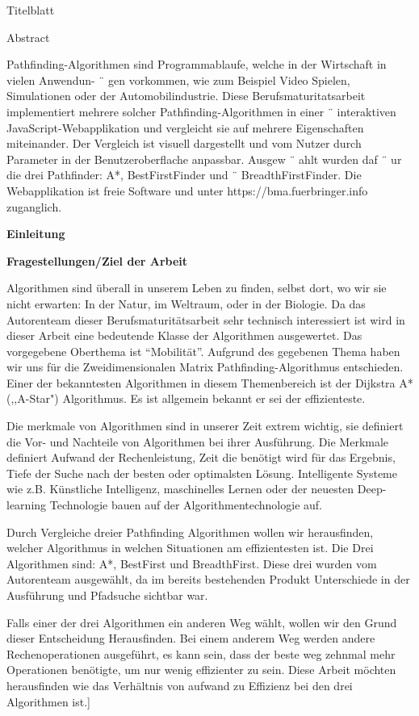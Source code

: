 Titelblatt

Abstract

Pathfinding-Algorithmen sind Programmablaufe, welche in der Wirtschaft
in vielen Anwendun- ¨ gen vorkommen, wie zum Beispiel Video Spielen,
Simulationen oder der Automobilindustrie. Diese Berufsmaturitatsarbeit
implementiert mehrere solcher Pathfinding-Algorithmen in einer ¨
interaktiven JavaScript-Webapplikation und vergleicht sie auf mehrere
Eigenschaften miteinander. Der Vergleich ist visuell dargestellt und vom
Nutzer durch Parameter in der Benutzeroberflache anpassbar. Ausgew ¨
ahlt wurden daf ¨ ur die drei Pathfinder: A*, BestFirstFinder und ¨
BreadthFirstFinder. Die Webapplikation ist freie Software und unter
https://bma.fuerbringer.info zuganglich.

\textbf{Einleitung}

\textbf{Fragestellungen/Ziel der Arbeit}

Algorithmen sind überall in unserem Leben zu finden, selbst dort, wo wir
sie nicht erwarten: In der Natur, im Weltraum, oder in der Biologie. Da
das Autorenteam dieser Berufsmaturitätsarbeit sehr technisch
interessiert ist wird in dieser Arbeit eine bedeutende Klasse der
Algorithmen ausgewertet. Das vorgegebene Oberthema ist ``Mobilität''.
Aufgrund des gegebenen Thema haben wir uns für die Zweidimensionalen
Matrix Pathfinding-Algorithmus entschieden. Einer der bekanntesten
Algorithmen in diesem Themenbereich ist der Dijkstra A* (,,A-Star")
Algorithmus. Es ist allgemein bekannt er sei der effizienteste.

Die merkmale von Algorithmen sind in unserer Zeit extrem wichtig, sie
definiert die Vor- und Nachteile von Algorithmen bei ihrer Ausführung.
Die Merkmale definiert Aufwand der Rechenleistung, Zeit die benötigt
wird für das Ergebnis, Tiefe der Suche nach der besten oder optimalsten
Lösung. Intelligente Systeme wie z.B. Künstliche Intelligenz,
maschinelles Lernen oder der neuesten Deep-learning Technologie bauen
auf der Algorithmentechnologie auf.

Durch Vergleiche dreier Pathfinding Algorithmen wollen wir herausfinden,
welcher Algorithmus in welchen Situationen am effizientesten ist. Die
Drei Algorithmen sind: A*, BestFirst und BreadthFirst. Diese drei wurden
vom Autorenteam ausgewählt, da im bereits bestehenden Produkt
Unterschiede in der Ausführung und Pfadsuche sichtbar war.

Falls einer der drei Algorithmen ein anderen Weg wählt, wollen wir den
Grund dieser Entscheidung Herausfinden. Bei einem anderem Weg werden
andere Rechenoperationen ausgeführt, es kann sein, dass der beste weg
zehnmal mehr Operationen benötigte, um nur wenig effizienter zu sein.
Diese Arbeit möchten herausfinden wie das Verhältnis von aufwand zu
Effizienz bei den drei Algorithmen ist.{]}

